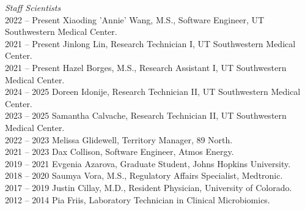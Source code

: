 \textit{Staff Scientists} \\
2022 -- Present \hspace{14pt} Xiaoding 'Annie' Wang, M.S., Software Engineer, UT Southwestern Medical Center. \\
2021 -- Present \hspace{14pt} Jinlong Lin, Research Technician I, UT Southwestern Medical Center. \\
2021 -- Present \hspace{14pt} Hazel Borges, M.S., Research Assistant I, UT Southwestern Medical Center. \\
2024 -- 2025 \hspace{28pt} Doreen Idonije, Research Technician II, UT Southwestern Medical Center. \\
2023 -- 2025 \hspace{28pt} Samantha Calvache, Research Technician II, UT Southwestern Medical Center. \\
2022 -- 2023 \hspace{28pt} Melissa Glidewell, Territory Manager, 89 North. \\
2021 -- 2023 \hspace{28pt} Dax Collison, Software Engineer, Atmos Energy. \\
2019 -- 2021 \hspace{28pt} Evgenia Azarova, Graduate Student, Johns Hopkins University. \\
2018 -- 2020 \hspace{28pt} Saumya Vora, M.S., Regulatory Affairs Specialist, Medtronic. \\
2017 -- 2019 \hspace{28pt} Justin Cillay, M.D., Resident Physician, University of Colorado. \\
2012 -- 2014 \hspace{28pt} Pia Friis,  Laboratory Technician in Clinical Microbiomics. \\

